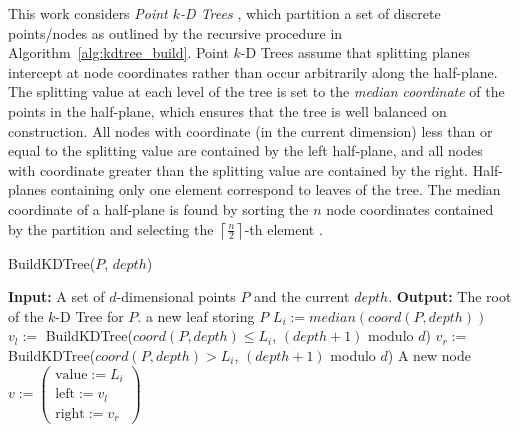 \documentclass{report}
\begin{document}
This work considers \emph{Point $k$-D Trees} \cite{Samet2005}, which partition a set of discrete points/nodes as outlined by the recursive procedure in Algorithm~\ref{alg:kdtree_build}. Point $k$-D Trees assume that splitting planes intercept at node coordinates rather than occur arbitrarily along the half-plane. The splitting value at each level of the tree is set to the \emph{median coordinate} of the points in the half-plane, which ensures that the tree is well balanced on construction. All nodes with coordinate (in the current dimension) less than or equal to the splitting value are contained by the left half-plane, and all nodes with coordinate greater than the splitting value are contained by the right. Half-planes containing only one element correspond to leaves of the tree. The median coordinate of a half-plane is found by sorting the $n$ node coordinates contained by the partition and selecting the $\left\lceil \frac{n}{2} \right\rceil$-th element \cite{Berg2008}. 
\begin{algorithm} 
\caption{BuildKDTree($P$, $depth$)}         \label{alg:kdtree_build}  
\begin{algorithmic}[1]    
    \State \textbf{Input:} A set of $d$-dimensional points $P$ and the current $depth$.
    \State \textbf{Output:} The root of the $k$-D Tree for $P$.
    \State
    \State \Return a new leaf storing $P$
    \EndIf
    \State $L_i := median(coord(P, depth))$ 
    \State $v_{l} := $ BuildKDTree($coord(P, depth) \leq L_i$, $(depth+1)$ modulo $d$)
    \State $v_{r} := $ BuildKDTree($coord(P, depth) > L_i$, $(depth+1)$ modulo $d$) 
    \State \Return A new node $v := \begin{pmatrix} \text{value} := L_i \\ \text{left} := v_l \\ \text{right} := v_r \end{pmatrix}$ 
\end{algorithmic}
\end{algorithm}
\end{document}
